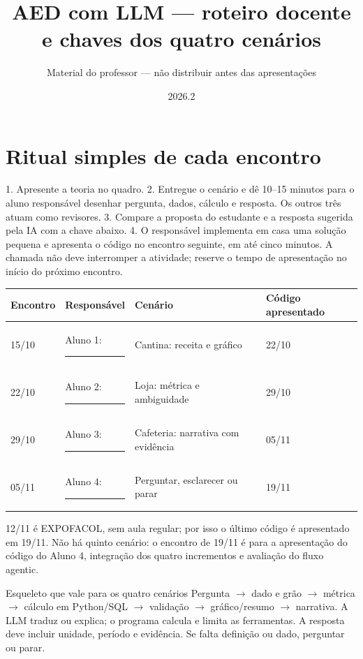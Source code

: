 \documentclass[10pt,a4paper]{article}
\title{AED com LLM --- roteiro docente e chaves dos quatro cenários}
\author{Material do professor --- não distribuir antes das apresentações}
\date{2026.2}
\begin{document}
\maketitle

\section*{Ritual simples de cada encontro}
1. Apresente a teoria no quadro. 2. Entregue o cenário e dê 10--15 minutos para o aluno responsável desenhar pergunta, dados, cálculo e resposta. Os outros três atuam como revisores. 3. Compare a proposta do estudante e a resposta sugerida pela IA com a chave abaixo. 4. O responsável implementa em casa uma solução pequena e apresenta o código no encontro seguinte, em até cinco minutos. A chamada não deve interromper a atividade; reserve o tempo de apresentação no início do próximo encontro.

\begin{center}\small
\begin{tabularx}{\textwidth}{p{1.3cm}p{2.6cm}X p{2.4cm}}\toprule
Encontro & Responsável & Cenário & Código apresentado \\\midrule
15/10 & Aluno 1: \rule{1.5cm}{0.4pt} & Cantina: receita e gráfico & 22/10 \\
22/10 & Aluno 2: \rule{1.5cm}{0.4pt} & Loja: métrica e ambiguidade & 29/10 \\
29/10 & Aluno 3: \rule{1.5cm}{0.4pt} & Cafeteria: narrativa com evidência & 05/11 \\
05/11 & Aluno 4: \rule{1.5cm}{0.4pt} & Perguntar, esclarecer ou parar & 19/11 \\\bottomrule
\end{tabularx}\end{center}
12/11 é EXPOFACOL, sem aula regular; por isso o último código é apresentado em 19/11. Não há quinto cenário: o encontro de 19/11 é para a apresentação do código do Aluno 4, integração dos quatro incrementos e avaliação do fluxo agentic.

\begin{quadro}{Esqueleto que vale para os quatro cenários}
Pergunta $\rightarrow$ dado e grão $\rightarrow$ métrica $\rightarrow$ cálculo em Python/SQL $\rightarrow$ validação $\rightarrow$ gráfico/resumo $\rightarrow$ narrativa. A LLM traduz ou explica; o programa calcula e limita as ferramentas. A resposta deve incluir unidade, período e evidência. Se falta definição ou dado, perguntar ou parar.
\end{quadro}
\end{document}
